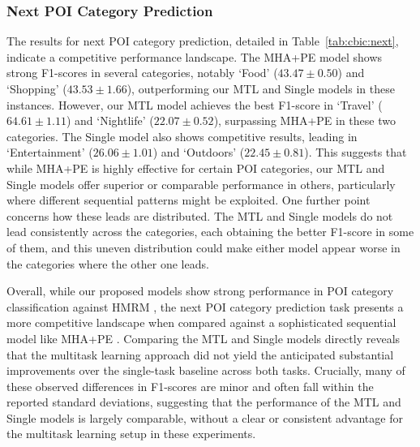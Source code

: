 

\subsubsection{Next POI Category Prediction}
The results for next POI category prediction, detailed in Table~\ref{tab:cbic:next}, indicate a competitive performance landscape. The MHA+PE model \cite{zeng2019next} shows strong F1-scores in several categories, notably `Food' ($43.47 \pm 0.50$) and `Shopping' ($43.53 \pm 1.66$), outperforming our MTL and Single models in these instances. However, our MTL model achieves the best F1-score in `Travel' ($64.61 \pm 1.11$) and `Nightlife' ($22.07 \pm 0.52$), surpassing MHA+PE in these two categories. The Single model also shows competitive results, leading in `Entertainment' ($26.06 \pm 1.01$) and `Outdoors' ($22.45 \pm 0.81$). This suggests that while MHA+PE is highly effective for certain POI categories, our MTL and Single models offer superior or comparable performance in others, particularly where different sequential patterns might be exploited. One further point concerns how these leads are distributed. The MTL and Single models do not lead consistently across the categories, each obtaining the better F1-score in some of them, and this uneven distribution could make either model appear worse in the categories where the other one leads.



Overall, while our proposed models show strong performance in POI category classification against HMRM \cite{chen2020modeling}, the next POI category prediction task presents a more competitive landscape when compared against a sophisticated sequential model like MHA+PE \cite{zeng2019next}. Comparing the MTL and Single models directly reveals that the multitask learning approach did not yield the anticipated substantial improvements over the single-task baseline across both tasks. Crucially, many of these observed differences in F1-scores are minor and often fall within the reported standard deviations, suggesting that the performance of the MTL and Single models is largely comparable, without a clear or consistent advantage for the multitask learning setup in these experiments.

